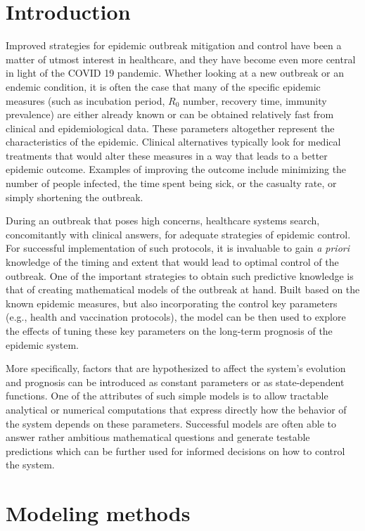 \documentclass[10pt]{article}
\begin{document}
\section{Introduction}


Improved strategies for epidemic outbreak mitigation and control have been a matter of utmost interest in healthcare, and they have become even more central in light of the COVID 19 pandemic. Whether looking at a new outbreak or an endemic condition, it is often the case that many of the specific epidemic measures (such as incubation period, $R_0$ number, recovery time, immunity prevalence) are either already known or can be obtained relatively fast from clinical and epidemiological data. These parameters altogether represent the characteristics of the epidemic. Clinical alternatives typically look for medical treatments that would alter these measures in a way that leads to a better epidemic outcome. Examples of improving the outcome include minimizing the number of people infected, the time spent being sick, or the casualty rate, or simply shortening the outbreak. 

During an outbreak that poses high concerns, healthcare systems search, concomitantly with clinical answers, for adequate strategies of epidemic control. For successful implementation of such protocols, it is invaluable to gain \emph{a priori} knowledge of the timing and extent that would lead to optimal control of the outbreak. One of the important strategies to obtain such predictive knowledge is that of creating mathematical models of the outbreak at hand. Built based on the known epidemic measures, but also incorporating the control key parameters (e.g., health and vaccination protocols), the model can be then used to explore the effects of tuning these key parameters on the long-term prognosis of the epidemic system.

More specifically, factors that are hypothesized to affect the system's evolution and prognosis can be introduced as constant parameters or as state-dependent functions. One of the attributes of such simple models is to allow tractable analytical or numerical computations that express directly how the behavior of the system depends on these parameters. Successful models are often able to answer rather ambitious mathematical questions and generate testable predictions which can be further used for informed decisions on how to control the system.

\section{Modeling methods}
\end{document}
